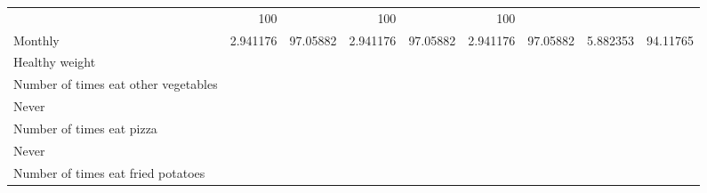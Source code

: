 \documentclass{article}
\begin{document}
\begin{tabular}{lllllllll}
  \multicolumn{1}{r}{} &
  \multicolumn{1}{r}{100} &
  \multicolumn{1}{r}{} &
  \multicolumn{1}{r}{100} &
  \multicolumn{1}{r}{} &
  \multicolumn{1}{r}{100} \\
\multicolumn{1}{l}{\hspace{7em}Monthly} &
  \multicolumn{1}{|r}{2.941176} &
  \multicolumn{1}{r}{97.05882} &
  \multicolumn{1}{r}{2.941176} &
  \multicolumn{1}{r}{97.05882} &
  \multicolumn{1}{r}{2.941176} &
  \multicolumn{1}{r}{97.05882} &
  \multicolumn{1}{r}{5.882353} &
  \multicolumn{1}{r}{94.11765} \\
\multicolumn{1}{l}{\hspace{1em}Healthy weight} &
  \multicolumn{1}{|r}{} &
  \multicolumn{1}{r}{} &
  \multicolumn{1}{r}{} &
  \multicolumn{1}{r}{} &
  \multicolumn{1}{r}{} &
  \multicolumn{1}{r}{} &
  \multicolumn{1}{r}{} &
  \multicolumn{1}{r}{} \\
\multicolumn{1}{l}{\hspace{2em}Number of times eat other vegetables} &
  \multicolumn{1}{|r}{} &
  \multicolumn{1}{r}{} &
  \multicolumn{1}{r}{} &
  \multicolumn{1}{r}{} &
  \multicolumn{1}{r}{} &
  \multicolumn{1}{r}{} &
  \multicolumn{1}{r}{} &
  \multicolumn{1}{r}{} \\
\multicolumn{1}{l}{\hspace{3em}Never} &
  \multicolumn{1}{|r}{} &
  \multicolumn{1}{r}{} &
  \multicolumn{1}{r}{} &
  \multicolumn{1}{r}{} &
  \multicolumn{1}{r}{} &
  \multicolumn{1}{r}{} &
  \multicolumn{1}{r}{} &
  \multicolumn{1}{r}{} \\
\multicolumn{1}{l}{\hspace{4em}Number of times eat pizza} &
  \multicolumn{1}{|r}{} &
  \multicolumn{1}{r}{} &
  \multicolumn{1}{r}{} &
  \multicolumn{1}{r}{} &
  \multicolumn{1}{r}{} &
  \multicolumn{1}{r}{} &
  \multicolumn{1}{r}{} &
  \multicolumn{1}{r}{} \\
\multicolumn{1}{l}{\hspace{5em}Never} &
  \multicolumn{1}{|r}{} &
  \multicolumn{1}{r}{} &
  \multicolumn{1}{r}{} &
  \multicolumn{1}{r}{} &
  \multicolumn{1}{r}{} &
  \multicolumn{1}{r}{} &
  \multicolumn{1}{r}{} &
  \multicolumn{1}{r}{} \\
\multicolumn{1}{l}{\hspace{6em}Number of times eat fried potatoes} &
  \multicolumn{1}{|r}{} &
  \multicolumn{1}{r}{} &
  \multicolumn{1}{r}{} &
  \multicolumn{1}{r}{} &
  \multicolumn{1}{r}{} &
  \multicolumn{1}{r}{} &
  \multicolumn{1}{r}{} &
  \multicolumn{1}{r}{} \\

\end{tabular}
\end{document}
